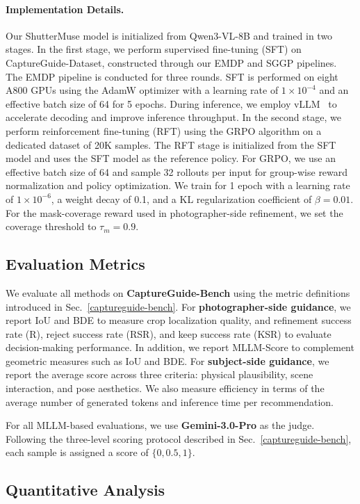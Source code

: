 \documentclass{article} %
\begin{document}
\paragraph{Implementation Details.}
Our ShutterMuse model is initialized from Qwen3-VL-8B and trained in two stages.
In the first stage, we perform supervised fine-tuning (SFT) on CaptureGuide-Dataset, constructed through our EMDP and SGGP pipelines. The EMDP pipeline is conducted for three rounds. SFT is performed on eight A800 GPUs using the AdamW optimizer with a learning rate of $1\times10^{-4}$ and an effective batch size of 64 for 5 epochs. During inference, we employ vLLM~\citep{kwon2023efficient} to accelerate decoding and improve inference throughput. In the second stage, we perform reinforcement fine-tuning (RFT) using the GRPO algorithm on a dedicated dataset of 20K samples. The RFT stage is initialized from the SFT model and uses the SFT model as the reference policy. For GRPO, we use an effective batch size of 64 and sample 32 rollouts per input for group-wise reward normalization and policy optimization. We train for 1 epoch with a learning rate of $1\times10^{-6}$, a weight decay of 0.1, and a KL regularization coefficient of $\beta=0.01$. For the mask-coverage reward used in photographer-side refinement, we set the coverage threshold to $\tau_m=0.9$.
\subsection{Evaluation Metrics}
We evaluate all methods on \textbf{CaptureGuide-Bench} using the metric definitions introduced in Sec.~\ref{captureguide-bench}. For \textbf{photographer-side guidance}, we report IoU and BDE to measure crop localization quality, and refinement success rate (R), reject success rate (RSR), and keep success rate (KSR) to evaluate decision-making performance. In addition, we report MLLM-Score to complement geometric measures such as IoU and BDE. For \textbf{subject-side guidance}, we report the average score across three criteria: physical plausibility, scene interaction, and pose aesthetics. We also measure efficiency in terms of the average number of generated tokens and inference time per recommendation.

For all MLLM-based evaluations, we use \textbf{Gemini-3.0-Pro} as the judge. Following the three-level scoring protocol described in Sec.~\ref{captureguide-bench}, each sample is assigned a score of $\{0, 0.5, 1\}$.

\subsection{Quantitative Analysis}
\end{document}
